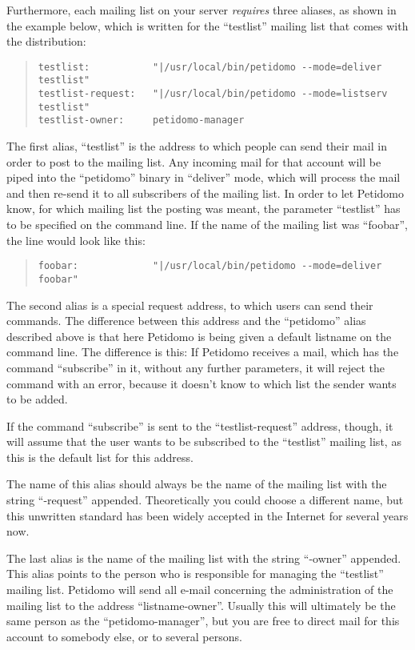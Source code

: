 \documentclass[a4paper,10pt]{scrreprt}
\begin{document}
Furthermore, each mailing list on your server \emph{requires} three
aliases, as shown in the example below, which is written for the
``testlist'' mailing list that comes with the distribution:
\begin{quote}
\begin{verbatim}
testlist:           "|/usr/local/bin/petidomo --mode=deliver testlist"
testlist-request:   "|/usr/local/bin/petidomo --mode=listserv testlist"
testlist-owner:     petidomo-manager
\end{verbatim}
\end{quote}

The first alias, ``testlist'' is the address to which people can send
their mail in order to post to the mailing list. Any incoming mail for
that account will be piped into the ``petidomo'' binary in ``deliver''
mode, which will process the mail and then re-send it to all
subscribers of the mailing list. In order to let Petidomo know, for
which mailing list the posting was meant, the parameter ``testlist''
has to be specified on the command line. If the name of the mailing
list was ``foobar'', the line would look like this:
\begin{quote}
\begin{verbatim}
foobar:             "|/usr/local/bin/petidomo --mode=deliver foobar"
\end{verbatim}
\end{quote}

The second alias is a special request address, to which users can send
their commands. The difference between this address and the
``petidomo'' alias described above is that here Petidomo is being
given a default listname on the command line. The difference is this:
If Petidomo receives a mail, which has the command ``subscribe'' in
it, without any further parameters, it will reject the command with an
error, because it doesn't know to which list the sender wants to be
added.

If the command ``subscribe'' is sent to the ``testlist-request''
address, though, it will assume that the user wants to be subscribed
to the ``testlist'' mailing list, as this is the default list for this
address.

The name of this alias should always be the name of the mailing list
with the string ``-request'' appended. Theoretically you could choose
a different name, but this unwritten standard has been widely accepted
in the Internet for several years now.

The last alias is the name of the mailing list with the string
``-owner'' appended. This alias points to the person who is
responsible for managing the ``testlist'' mailing list. Petidomo
will send all e-mail concerning the administration of the mailing list
to the address ``listname-owner''. Usually this will ultimately be the
same person as the ``petidomo-manager'', but you are free to direct
mail for this account to somebody else, or to several persons.
\end{document}
